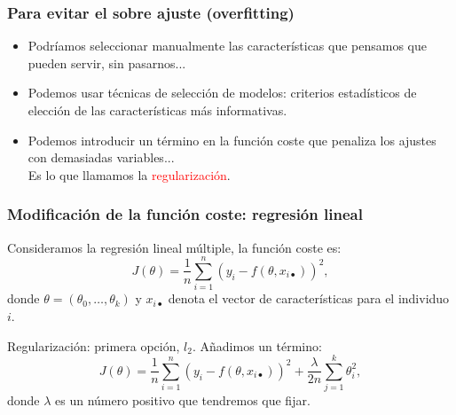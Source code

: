 \documentclass{beamer}
\begin{document}
 \begin{frame}\frametitle{Para evitar el sobre ajuste (overfitting)}
   \begin{overlayarea}{\textwidth}{8cm} 
     \begin{itemize}
     \item<2-> Podríamos seleccionar manualmente las características que pensamos que pueden servir, sin pasarnos...
     \item<3-> Podemos usar técnicas de selección de modelos: criterios estadísticos de elección de las características más informativas.
     \item<4-> Podemos introducir un término en la función coste que penaliza los ajustes con demasiadas variables...\\  Es lo que llamamos la \textcolor{red}{regularización}.
     \end{itemize}

   \end{overlayarea}
   
 \end{frame}

 
 \begin{frame}\frametitle{Modificación de la función coste: regresión lineal}
   \begin{overlayarea}{\textwidth}{8cm} 
     Consideramos la regresión lineal múltiple, la función coste es: 
$$J(\theta)=\frac 1 n\sum_{i=1}^n\left(y_i-f(\theta,x_{i\bullet})\right)^2,$$
     donde $\theta=(\theta_0,\ldots,\theta_k)$ y $x_{i\bullet}$ denota el vector de características para el individuo $i$. 
 \begin{block}{Regularización: primera opción, $l_2$.}
 Añadimos un término: 
 $$J(\theta)=\frac 1
 n\sum_{i=1}^n\left(y_i-f(\theta,x_{i\bullet})\right)^2 +  \frac \lambda {2n}  \sum_{j=1}^{k}\theta_i^2, $$
 donde $\lambda$ es un número positivo que tendremos que fijar.   
 \end{block}
   \end{overlayarea}
 \end{frame}
\end{document}
